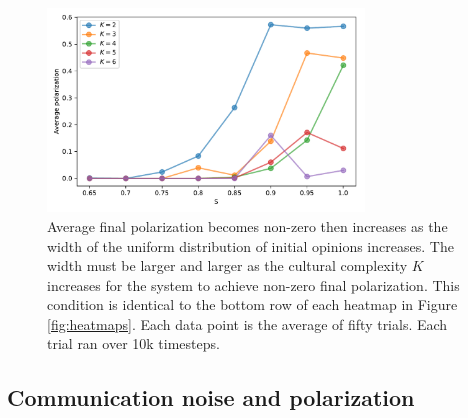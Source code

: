 \documentclass[11pt,letterpaper]{article}
\begin{document}
\begin{figure}
  \centering
  \includegraphics[width=0.75\textwidth]{Figures/P_vs_S_for_K.pdf}
  \caption{
    Average final polarization becomes non-zero then increases as
    the width of the uniform distribution of initial opinions increases.
    The width must be larger and larger as the cultural complexity $K$ 
    increases for the system to achieve non-zero final polarization. This
    condition is identical to the bottom row of each heatmap in 
    Figure \ref{fig:heatmaps}. Each
    data point is the average of fifty trials. Each trial ran over 
    10k timesteps. 
  }
  \label{fig:p_vs_s_for_k}
\end{figure}

\subsection{Communication noise and polarization}
\end{document}
